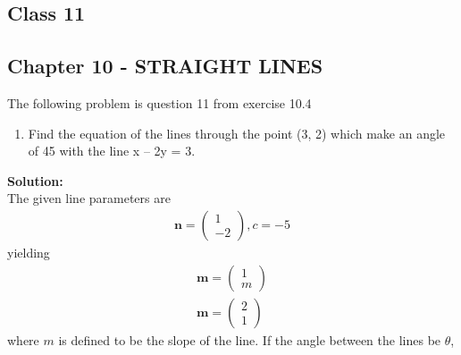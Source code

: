 \documentclass[10pt,a4paper]{report}
\newcommand{\myvec}[1]{\ensuremath{\begin{pmatrix}#1\end{pmatrix}}}
\let\vec\mathbf
\let\vec\mathbf
\renewcommand{\vec}[1]{\textbf{#1}}
\begin{document}
\onehalfspacing
\begin{center}
	\section*{\textbf{Class 11}}
	\subsection*{Chapter 10 - STRAIGHT LINES}
\end{center}
The following problem is question 11 from exercise 10.4
\begin{enumerate}
    \item Find the equation of the lines through the point (3, 2) which make an angle of 45\textdegree \hspace{0.1cm} with the line x – 2y = 3.
\end{enumerate}
\textbf{Solution:}\\
The given line parameters are
\begin{align}
   \vec{n}=\myvec{1\\-2},c=-5
\end{align}
yielding
\begin{align}
\vec{m}=\myvec{1\\m}\\
\vec{m}=\myvec{2\\1}
\end{align}
where  $m$ is defined to be the slope of the line. If the angle between the lines be $\theta$,
\end{document}
